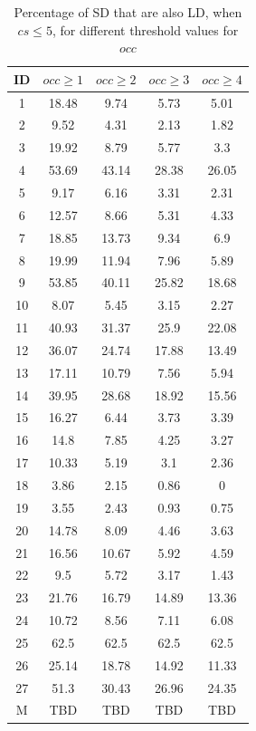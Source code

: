 \documentclass[a4paper,twoside]{article}
\begin{document}
\begin{table}[!h]
\renewcommand{\arraystretch}{1.25}
\caption{Percentage of SD that are also LD,  when $cs \leq 5$, for different threshold values for $occ$}
\label{table:10}
\centering
\begin{tabular}{|c|c|c|c|c|}
\hline
    ID  & $occ\geq 1$ & $occ\geq 2$ & $occ\geq 3$ & $occ\geq 4$  \\
\hline
1	&	18.48	&	9.74	&	5.73	&	5.01	\\
2	&	9.52	&	4.31	&	2.13	&	1.82	\\
3	&	19.92	&	8.79	&	5.77	&	3.3	\\
4	&	53.69	&	43.14	&	28.38	&	26.05	\\
5	&	9.17	&	6.16	&	3.31	&	2.31	\\
6	&	12.57	&	8.66	&	5.31	&	4.33	\\
7	&	18.85	&	13.73	&	9.34	&	6.9	\\
8	&	19.99	&	11.94	&	7.96	&	5.89	\\
9	&	53.85	&	40.11	&	25.82	&	18.68	\\
10	&	8.07	&	5.45	&	3.15	&	2.27	\\
11	&	40.93	&	31.37	&	25.9	&	22.08	\\
12	&	36.07	&	24.74	&	17.88	&	13.49	\\
13	&	17.11	&	10.79	&	7.56	&	5.94	\\
14	&	39.95	&	28.68	&	18.92	&	15.56	\\
15	&	16.27	&	6.44	&	3.73	&	3.39	\\
16	&	14.8	&	7.85	&	4.25	&	3.27	\\
17	&	10.33	&	5.19	&	3.1	&	2.36	\\
18	&	3.86	&	2.15	&	0.86	&	0	\\
19	&	3.55	&	2.43	&	0.93	&	0.75	\\
20	&	14.78	&	8.09	&	4.46	&	3.63	\\
21	&	16.56	&	10.67	&	5.92	&	4.59	\\
22	&	9.5	&	5.72	&	3.17	&	1.43	\\
23	&	21.76	&	16.79	&	14.89	&	13.36	\\
24	&	10.72	&	8.56	&	7.11	&	6.08	\\
25	&	62.5	&	62.5	&	62.5	&	62.5	\\
26	&	25.14	&	18.78	&	14.92	&	11.33	\\
27	&	51.3	&	30.43	&	26.96	&	24.35	\\
\hline
M	&	TBD&	TBD	&	TBD	&	TBD	\\
\hline
\end{tabular}
\end{table}
\end{document}
